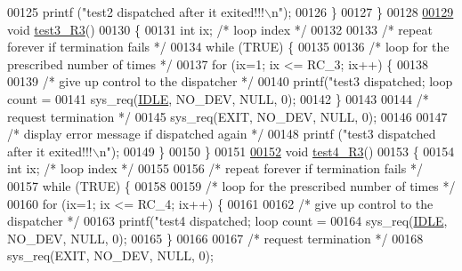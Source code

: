 \begin{DoxyCode}
{{00125                 printf (\textcolor{stringliteral}{"test2 dispatched after it exited!!!\(\backslash\)n"});
00126         \}
00127  \}
00128 
\hypertarget{procs-r3_8c_source_l00129}{}\hyperlink{procs-r3_8c_a453a58ecc6482a24bf02e7caf67aa41a}{00129} \textcolor{keywordtype}{void} \hyperlink{procs-r3_8c_a453a58ecc6482a24bf02e7caf67aa41a}{test3_R3}()
00130 \{
00131         \textcolor{keywordtype}{int} ix; \textcolor{comment}{/* loop index */}
00132         
00133         \textcolor{comment}{/* repeat forever if termination fails */}
00134         \textcolor{keywordflow}{while} (TRUE) \{
00135 
00136                 \textcolor{comment}{/* loop for the prescribed number of times */}
00137                 \textcolor{keywordflow}{for} (ix=1; ix <= RC\_3; ix++) \{
00138 
00139                         \textcolor{comment}{/* give up control to the dispatcher */}
00140                         printf(\textcolor{stringliteral}{"test3 dispatched; loop count = %
00141                         sys\_req(\hyperlink{_m_p_x___r5_8h_a9c21a7caee326d7803b94ae1952b27ca}{IDLE}, NO\_DEV, NULL, 0);
00142                 \}
00143 
00144                 \textcolor{comment}{/* request termination */}
00145                 sys\_req(EXIT, NO\_DEV, NULL, 0);
00146 
00147                 \textcolor{comment}{/* display error message if dispatched again */}
00148                 printf (\textcolor{stringliteral}{"test3 dispatched after it exited!!!\(\backslash\)n"});
00149         \}
00150  \}
00151 
\hypertarget{procs-r3_8c_source_l00152}{}\hyperlink{procs-r3_8c_aaa737ca092fa5d35b33665401852fb7b}{00152} \textcolor{keywordtype}{void} \hyperlink{procs-r3_8c_aaa737ca092fa5d35b33665401852fb7b}{test4_R3}()
00153 \{
00154         \textcolor{keywordtype}{int} ix; \textcolor{comment}{/* loop index */}
00155         
00156         \textcolor{comment}{/* repeat forever if termination fails */}
00157         \textcolor{keywordflow}{while} (TRUE) \{
00158 
00159                 \textcolor{comment}{/* loop for the prescribed number of times */}
00160                 \textcolor{keywordflow}{for} (ix=1; ix <= RC\_4; ix++) \{
00161 
00162                         \textcolor{comment}{/* give up control to the dispatcher */}
00163                         printf(\textcolor{stringliteral}{"test4 dispatched; loop count = %
00164                         sys\_req(\hyperlink{_m_p_x___r5_8h_a9c21a7caee326d7803b94ae1952b27ca}{IDLE}, NO\_DEV, NULL, 0);
00165                 \}
00166 
00167                 \textcolor{comment}{/* request termination */}
00168                 sys\_req(EXIT, NO\_DEV, NULL, 0);
}}}}
\end{DoxyCode}

